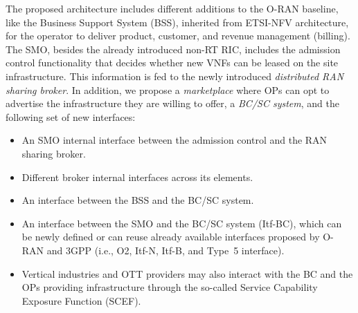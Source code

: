 \documentclass[journal]{IEEEtran}
\begin{document}
The proposed architecture includes different additions to the O-RAN baseline, like the Business Support System (BSS), inherited from ETSI-NFV architecture, for the operator to deliver product, customer, and revenue management (billing). The SMO, besides the already introduced non-RT RIC, includes the admission control functionality that decides whether new VNFs can be leased on the site infrastructure. This information is fed to the newly introduced \textit{distributed RAN sharing broker}. In addition, we propose a \textit{marketplace} where OPs can opt to advertise the infrastructure they are willing to offer, a \textit{BC/SC system}, and the following set of new interfaces: 
\begin{itemize}
    \item An SMO internal interface between the admission control and the RAN sharing broker.
    \item Different broker internal interfaces across its elements.
    \item An interface between the BSS and the BC/SC system.
    \item An interface between the SMO and the BC/SC system (Itf-BC), which can be newly defined or can reuse already available interfaces proposed by O-RAN and 3GPP (i.e., O2, Itf-N, Itf-B, and Type~5 interface).
    \item Vertical industries and OTT providers may also interact with the BC and the OPs providing infrastructure through the so-called Service Capability Exposure Function (SCEF).
\end{itemize}
\end{document}
